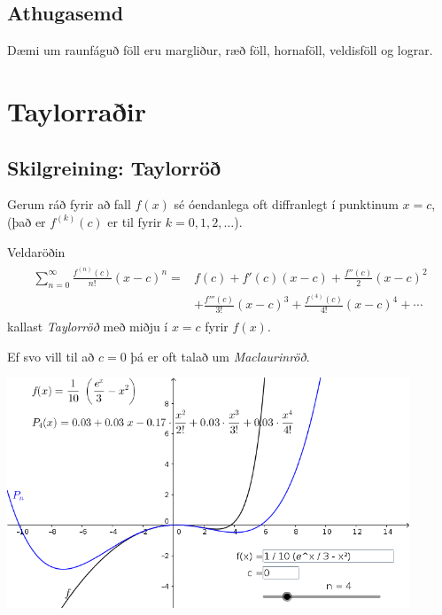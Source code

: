 \documentclass[a4paper,10pt,icelandic]{sphinxmanual}
\begin{document}
\subsection{Athugasemd}
\label{kafli10:athugasemd}
Dæmi um raunfáguð föll eru margliður, ræð föll, hornaföll, veldisföll og
lograr.


\section{Taylorraðir}
\label{kafli10:taylorrair}\label{kafli10:index-6}

\subsection{Skilgreining: Taylorröð}
\label{kafli10:skilgreining-taylorro}
Gerum ráð fyrir að fall \(f(x)\) sé óendanlega oft diffranlegt í
punktinum \(x=c\), (það er \(f^{(k)}(c)\) er til fyrir
\(k=0, 1, 2, \ldots\)).

Veldaröðin
\begin{equation*}
\begin{split}\begin{aligned}
\sum_{n=0}^\infty \frac{f^{(n)}(c)}{n!}(x-c)^n = & f(c)+f'(c)(x-c)+
\frac{f''(c)}{2}(x-c)^2 \\ & + \frac{f'''(c)}{3!}(x-c)^3
+ \frac{f^{(4)}(c)}{4!}(x-c)^4 + \cdots \end{aligned}\end{split}
\end{equation*}
kallast \emph{Taylorröð} með miðju í \(x=c\) fyrir \(f(x)\).

Ef svo vill til að \(c=0\) þá er oft talað um \emph{Maclaurinröð}.


\begin{center}
\includegraphics[width=12cm,keepaspectratio=true]{03_Taylorrod.png}
\end{center}
\end{document}
